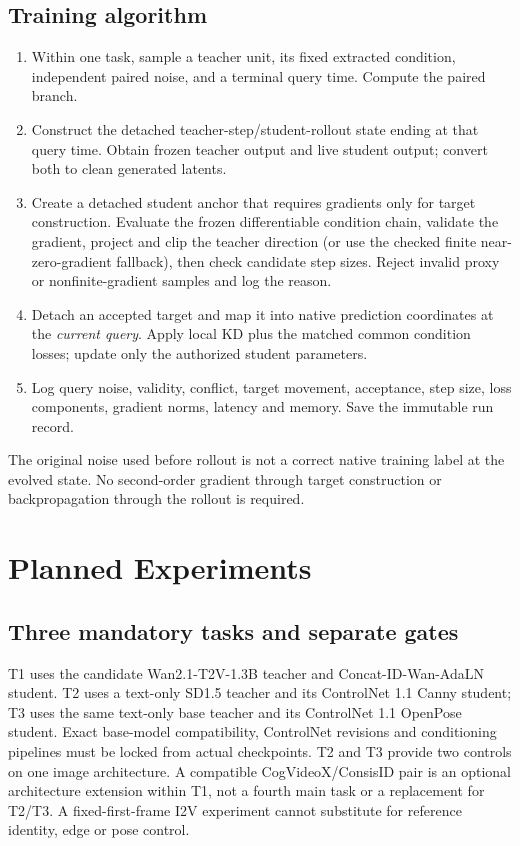 \documentclass[11pt]{article}
\begin{document}
\subsection{Training algorithm}
\begin{enumerate}
\item Within one task, sample a teacher unit, its fixed extracted condition, independent paired noise, and a terminal query time. Compute the paired branch.
\item Construct the detached teacher-step/student-rollout state ending at that query time. Obtain frozen teacher output and live student output; convert both to clean generated latents.
\item Create a detached student anchor that requires gradients only for target construction. Evaluate the frozen differentiable condition chain, validate the gradient, project and clip the teacher direction (or use the checked finite near-zero-gradient fallback), then check candidate step sizes. Reject invalid proxy or nonfinite-gradient samples and log the reason.
\item Detach an accepted target and map it into native prediction coordinates at the \emph{current query}. Apply local KD plus the matched common condition losses; update only the authorized student parameters.
\item Log query noise, validity, conflict, target movement, acceptance, step size, loss components, gradient norms, latency and memory. Save the immutable run record.
\end{enumerate}
The original noise used before rollout is not a correct native training label at the evolved state. No second-order gradient through target construction or backpropagation through the rollout is required.

\section{Planned Experiments}
\subsection{Three mandatory tasks and separate gates}
T1 uses the candidate Wan2.1-T2V-1.3B teacher and Concat-ID-Wan-AdaLN student. T2 uses a text-only SD1.5 teacher and its ControlNet 1.1 Canny student; T3 uses the same text-only base teacher and its ControlNet 1.1 OpenPose student. Exact base-model compatibility, ControlNet revisions and conditioning pipelines must be locked from actual checkpoints. T2 and T3 provide two controls on one image architecture. A compatible CogVideoX/ConsisID pair is an optional architecture extension within T1, not a fourth main task or a replacement for T2/T3. A fixed-first-frame I2V experiment cannot substitute for reference identity, edge or pose control.
\end{document}
